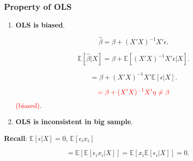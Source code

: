 \documentclass[12pt, oneside]{article}
\begin{document}
\subsubsection{Property of OLS}
\begin{enumerate}
        \item \textbf{OLS is biased}. 
        
        \[
        \hat{\beta} = \beta + (X'X)^{-1} X' \epsilon.
        \]

        \[
        \mathbb{E}[\hat{\beta} | X] = \beta + \mathbb{E}[(X'X)^{-1} X' \epsilon | X].
        \]

        \[
        = \beta + (X'X)^{-1} X' \mathbb{E}[\epsilon | X].
        \]

        \[
        \textcolor{red}{= \beta + (X'X)^{-1} X' \eta \neq \beta}
        \] 
        \textcolor{red}{(biased)}.
        \item \textbf{OLS is inconsistent in big sample}.
    \end{enumerate}

\textbf{Recall}: \( \mathbb{E}[\epsilon | X] = 0 \), \quad \( \mathbb{E}[\epsilon_i x_i] \)

\[
= \mathbb{E} \left[ \mathbb{E}[\epsilon_i x_i | X] \right] = \mathbb{E} \left[ x_i \mathbb{E}[\epsilon_i | X] \right] = 0.
\]

\noindent\hrulefill
\end{document}

